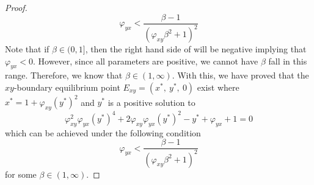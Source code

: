 \begin{proof}
    \begin{equation}\label{eq:xy-eq-condition}
        \varphi_{yx}<\frac{\beta-1}{\left(\varphi_{xy}\beta^2+1\right)^2}
    \end{equation}
    Note that if $\beta\in(0, 1]$, then the right hand side of  will be negative implying that $\varphi_{yx}<0$. However, since all parameters are positive, we cannot have $\beta$ fall in this range. Therefore, we know that $\beta\in\left(1,\infty\right)$. With this, we have proved that the $xy$-boundary equilibrium point $E_{xy}=\left(x^*,\ y^*,\ 0\right)$ exist where $x^*=1+\varphi_{xy}\left(y^*\right)^2$ and $y^*$ is a positive solution to
    \begin{equation*}
        \varphi_{xy}^2\varphi_{yx}\left(y^*\right)^4+2\varphi_{xy}\varphi_{yx}\left(y^*\right)^2-y^*+\varphi_{yx}+1=0
    \end{equation*}
    which can be achieved under the following condition
    \begin{equation*}
        \varphi_{yx}<\frac{\beta-1}{\left(\varphi_{xy}\beta^2+1\right)^2}
    \end{equation*}
    for some $\beta\in\left(1, \infty\right)$.
\end{proof}


